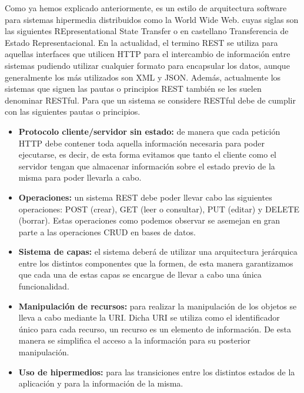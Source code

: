 Como ya hemos explicado anteriormente, es un estilo de arquitectura software para sistemas hipermedia distribuidos como la World Wide Web. \cite{wiki:rest2} cuyas siglas son las siguientes REpresentational State Transfer o en castellano Transferencia de Estado Representacional.
En la actualidad, el termino REST se utiliza para aquellas interfaces que utilicen HTTP para el intercambio de información entre sistemas pudiendo utilizar cualquier formato para encapsular los datos, aunque generalmente los más utilizados son XML y JSON. Además, actualmente los sistemas que siguen las pautas o principios REST también se les suelen denominar RESTful.
Para que un sistema se considere RESTful debe de cumplir con las siguientes pautas o principios.

\begin{itemize}

	\item \textbf{Protocolo cliente/servidor sin estado:} de manera que cada petición HTTP debe contener toda aquella información necesaria para poder ejecutarse, es decir, de esta forma evitamos que tanto el cliente como el servidor tengan que almacenar información sobre el estado previo de la misma para poder llevarla a cabo.
	
	\item \textbf{Operaciones:} un sistema REST debe poder llevar cabo las siguientes operaciones: POST (crear), GET (leer o consultar), PUT (editar) y DELETE (borrar). Estas operaciones como podemos observar se asemejan en gran parte a las operaciones CRUD en bases de datos.
	
	\item \textbf{Sistema de capas:} el sistema deberá de utilizar una arquitectura jerárquica entre los distintos componentes que la formen, de esta manera garantizamos que cada una de estas capas se encargue de llevar a cabo una única funcionalidad.
	
	\item \textbf{Manipulación de recursos:} para realizar la manipulación de los objetos se lleva a cabo mediante la URI. Dicha URI se utiliza como el identificador único para cada recurso, un recurso es un elemento de información. De esta manera se simplifica el acceso a la información para su posterior manipulación.
	
	\item \textbf{Uso de hipermedios:} para las transiciones entre los distintos estados de la aplicación y para la información de la misma.
	
\end{itemize}

\cite{wiki:rest}
 

